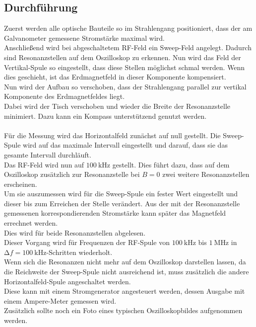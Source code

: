 \subsection{Durchführung}

Zuerst werden alle optische Bauteile so im Strahlengang positioniert, dass der am Galvanometer gemessene Stromstärke maximal wird.\\
Anschließend wird bei abgeschaltetem RF-Feld ein Sweep-Feld angelegt. Dadurch sind Resonanzstellen auf dem Oszilloskop zu erkennen.
Nun wird das Feld der Vertikal-Spule so eingestellt, dass diese Stellen möglichst schmal werden. Wenn dies geschieht, ist das Erdmagnetfeld in dieser Komponente kompensiert.\\
Nun wird der Aufbau so verschoben, dass der Strahlengang parallel zur vertikal Komponente des Erdmagnetfeldes liegt. \\
Dabei wird der Tisch verschoben und wieder die Breite der Resonanzstelle minimiert. Dazu kann ein Kompass unterstützend genutzt werden.\\\\
Für die Messung wird das Horizontalfeld zunächst auf null gestellt.
Die Sweep-Spule wird auf das maximale Intervall eingestellt und darauf, dass sie das gesamte Intervall durchläuft.\\
Das RF-Feld wird nun auf $\SI{100}{\kilo\hertz}$ gestellt.
Dies führt dazu, dass auf dem Oszilloskop zusätzlich zur Resonanzstelle bei $B=0$ zwei weitere Resonanzstellen erscheinen.\\
Um sie auszumessen wird für die Sweep-Spule ein fester Wert eingestellt und dieser bis zum Erreichen der Stelle verändert.
Aus der mit der Resonanzstelle gemessenen korrespondierenden Stromstärke kann später das Magnetfeld errechnet werden.\\
Dies wird für beide Resonanzstellen abgelesen.\\
Dieser Vorgang wird für Frequenzen der RF-Spule von $\SI{100}{\kilo\hertz}$  bis $\SI{1}{\mega\hertz}$ in $\increment f = \SI{100}{\kilo\hertz}$-Schritten wiederholt.\\
Wenn sich die Resonanzen nicht mehr auf dem Oszilloskop darstellen lassen, da die Reichweite der Sweep-Spule nicht ausreichend ist, muss zusätzlich die andere Horizontalfeld-Spule angeschaltet werden.\\
Diese kann mit einem Stromgenerator angesteuert werden, dessen Ausgabe mit einem Ampere-Meter gemessen wird.\\
Zusätzlich sollte noch ein Foto eines typischen Oszilloskopbildes aufgenommen werden.